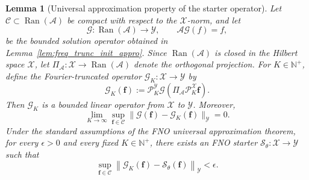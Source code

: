 \documentclass[preprint,numbers,sort&compress]{elsarticle}
\newtheorem{lemma}{Lemma}
\begin{document}
			\begin{lemma}[Universal approximation property of the starter operator]
				\label{lem:fno_universal}
				Let $\mathcal C\subset\operatorname{Ran}(\mathcal A)$
				be compact with respect to the $\mathcal X$-norm, and let
				\[
				\mathcal G: \operatorname{Ran}(\mathcal A)\to\mathcal Y,
				\qquad
				\mathcal A\mathcal G(f)=f,
				\]
				be the bounded solution operator obtained in
				Lemma~\ref{lem:freq_trunc_init_appro}.
				Since $\operatorname{Ran}(\mathcal A)$ is closed in the Hilbert space
				$\mathcal X$, let $\Pi_{\mathcal A}: \mathcal X\to\operatorname{Ran}(\mathcal A)$ denote the orthogonal projection. For $K\in\mathbb N^+$, define the Fourier-truncated operator
				$\mathcal G_K:\mathcal X\to\mathcal Y$ by
				\begin{equation}
					\label{eq:operator_proj}
					\mathcal G_K(\boldsymbol f)
					:=
					\mathcal P_K^{\mathcal Y}
					\mathcal G
					\left(
					\Pi_{\mathcal A}
					\mathcal P_K^{\mathcal X}
					\boldsymbol f
					\right).
				\end{equation}
				Then $\mathcal G_K$ is a bounded linear operator from
				$\mathcal X$ to $\mathcal Y$. Moreover,
				\[
				\lim_{K\to\infty}
				\sup_{\boldsymbol f\in\mathcal C}
				\|
				\mathcal G(\boldsymbol f)
				-
				\mathcal G_K(\boldsymbol f)
				\|_{\mathcal Y}
				=0.
				\]
				Under the standard assumptions of the FNO universal approximation
				theorem, for every $\epsilon>0$ and every fixed $K\in\mathbb N^+$,
				there exists an FNO starter
				$\mathcal S_\theta:\mathcal X\to\mathcal Y$ such that
				\[
				\sup_{\boldsymbol f\in\mathcal C}
				\left\|
				\mathcal G_K(\boldsymbol f)
				-
				\mathcal S_\theta(\boldsymbol f)
				\right\|_{\mathcal Y}
				<\epsilon.
				\]
			\end{lemma}
			
\end{document}
